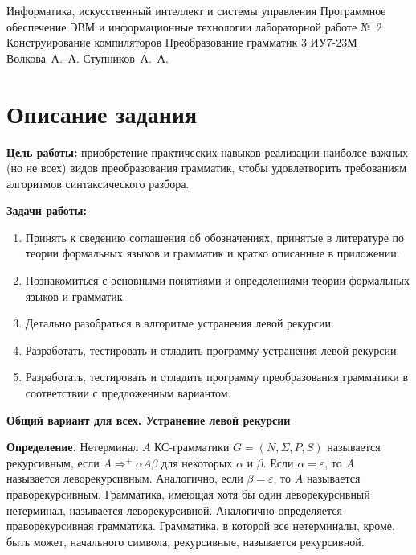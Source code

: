 \documentclass{bmstu-gost-7-32}
\begin{document}
\makereporttitle
	{Информатика, искусственный интеллект и системы управления} %
	{Программное обеспечение ЭВМ и информационные технологии} %
	{лабораторной работе №~2} %
	{Конструирование компиляторов} %
	{Преобразование грамматик} %
	{3} %
	{ИУ7-23М} %
	{Волкова~А.~А.} %
	{Ступников~А.~А.} %

\section*{Описание задания}

\textbf{Цель работы:} приобретение практических навыков реализации наиболее важных (но не всех) видов преобразования грамматик, чтобы удовлетворить требованиям алгоритмов синтаксического разбора.

\textbf{Задачи работы:}
\begin{enumerate}
	\item Принять к сведению соглашения об обозначениях, принятые в литературе по теории формальных языков и грамматик и кратко описанные в приложении.
	\item Познакомиться с основными понятиями и определениями теории формальных языков и грамматик.
	\item Детально разобраться в алгоритме устранения левой рекурсии.
	\item Разработать, тестировать и отладить программу устранения левой рекурсии.
	\item Разработать, тестировать и отладить программу преобразования грамматики в соответствии с предложенным вариантом.
\end{enumerate}

\textbf{Общий вариант для всех. Устранение левой рекурсии}

\textbf{Определение.}
Нетерминал $A$ КС-грамматики $G = (N, \Sigma, P, S)$ называется рекурсивным, если $A \Rightarrow^+ \alpha A \beta$ для некоторых $\alpha$ и $\beta$.
Если $\alpha = \varepsilon$, то $A$ называется леворекурсивным.
Аналогично, если $\beta = \varepsilon$, то $A$ называется праворекурсивным.
Грамматика, имеющая хотя бы один леворекурсивный нетерминал, называется леворекурсивной.
Аналогично определяется праворекурсивная грамматика.
Грамматика, в которой все нетерминалы, кроме, быть может, начального символа, рекурсивные, называется рекурсивной.
\end{document}
